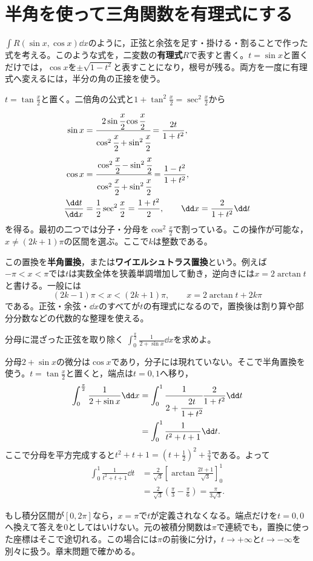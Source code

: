 \section{半角を使って三角関数を有理式にする}\label{節:半角置換}

$\int R(\sin x,\cos x)\dd x$のように，正弦と余弦を足す・掛ける・割ることで作った式を考える。このような式を，二変数の\textbf{有理式}$R$で表すと書く。$t=\sin x$と置くだけでは，$\cos x$を$\pm\sqrt{1-t^2}$と表すことになり，根号が残る。両方を一度に有理式へ変えるには，半分の角の正接を使う。

$t=\tan\frac x2$と置く。二倍角の公式と$1+\tan^2\frac x2=\sec^2\frac x2$から
\begin{equation}\label{式:半角置換}
\begin{aligned}
\sin x&=\cfrac{2\sin\cfrac x2\cos\cfrac x2}
 {\cos^2\cfrac x2+\sin^2\cfrac x2}
 =\frac{2t}{1+t^2},\\
\cos x&=\cfrac{\cos^2\cfrac x2-\sin^2\cfrac x2}
 {\cos^2\cfrac x2+\sin^2\cfrac x2}
 =\frac{1-t^2}{1+t^2},\\
\frac{\dd t}{\dd x}&=\frac12\sec^2\frac x2
 =\frac{1+t^2}{2},\qquad
\dd x=\frac{2}{1+t^2}\dd t
\end{aligned}
\end{equation}
を得る。最初の二つでは分子・分母を$\cos^2\frac x2$で割っている。この操作が可能な，$x\ne(2k+1)\pi$の区間を選ぶ。ここで$k$は整数である。

この置換を\textbf{半角置換}，または\textbf{ワイエルシュトラス置換}という。例えば$-\pi<x<\pi$では$t$は実数全体を狭義単調増加して動き，逆向きには$x=2\arctan t$と書ける。一般には
\[
(2k-1)\pi<x<(2k+1)\pi,\qquad
x=2\arctan t+2k\pi
\]
である。正弦・余弦・$\dd x$のすべてが$t$の有理式になるので，置換後は割り算や部分分数などの代数的な整理を使える。

\begin{example}{分母に混ざった正弦を取り除く}
$\int_0^{\frac\pi2}\frac1{2+\sin x}\dd x$を求めよ。
\end{example}

分母$2+\sin x$の微分は$\cos x$であり，分子には現れていない。そこで半角置換を使う。$t=\tan\frac x2$と置くと，端点は$t=0,1$へ移り，
\[
\begin{aligned}
\int_0^{\frac\pi2}\frac1{2+\sin x}\dd x
&=\int_0^1\cfrac1{2+\cfrac{2t}{1+t^2}}
 \frac2{1+t^2}\dd t\\
&=\int_0^1\frac1{t^2+t+1}\dd t.
\end{aligned}
\]
ここで分母を平方完成すると$t^2+t+1=\left(t+\frac12\right)^2+\frac34$である。よって
\[
\begin{aligned}
\int_0^1\frac1{t^2+t+1}\dd t
&=\frac2{\sqrt3}\left[\arctan\frac{2t+1}{\sqrt3}\right]_0^1\\
&=\frac2{\sqrt3}\left(\frac\pi3-\frac\pi6\right)
=\frac\pi{3\sqrt3}.
\end{aligned}
\]

もし積分区間が$[0,2\pi]$なら，$x=\pi$で$t$が定義されなくなる。端点だけを$t=0,0$へ換えて答えを$0$としてはいけない。元の被積分関数は$\pi$で連続でも，置換に使った座標はそこで途切れる。この場合には$\pi$の前後に分け，$t\to+\infty$と$t\to-\infty$を別々に扱う。章末問題で確かめる。

